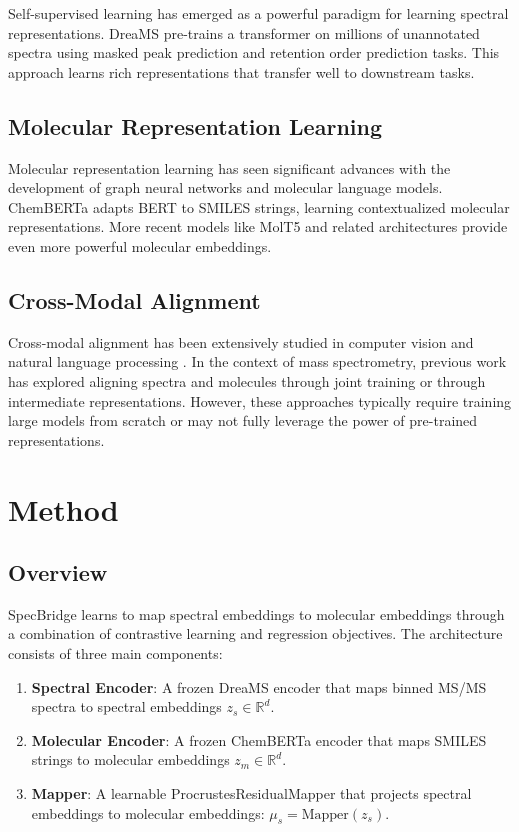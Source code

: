 \documentclass[11pt]{article}
\begin{document}
Self-supervised learning has emerged as a powerful paradigm for learning spectral representations. DreaMS \cite{bushuiev2025selfsupervised} pre-trains a transformer on millions of unannotated spectra using masked peak prediction and retention order prediction tasks. This approach learns rich representations that transfer well to downstream tasks.

\subsection{Molecular Representation Learning}

Molecular representation learning has seen significant advances with the development of graph neural networks \cite{kipf2016semi} and molecular language models. ChemBERTa \cite{chithrananda2020chemberta} adapts BERT to SMILES strings, learning contextualized molecular representations. More recent models like MolT5 \cite{edwards2022translation} and related architectures provide even more powerful molecular embeddings.

\subsection{Cross-Modal Alignment}

Cross-modal alignment has been extensively studied in computer vision and natural language processing \cite{radford2021learning}. In the context of mass spectrometry, previous work has explored aligning spectra and molecules through joint training \cite{wei2019retrieving} or through intermediate representations. However, these approaches typically require training large models from scratch or may not fully leverage the power of pre-trained representations.

\section{Method}

\subsection{Overview}

SpecBridge learns to map spectral embeddings to molecular embeddings through a combination of contrastive learning and regression objectives. The architecture consists of three main components:

\begin{enumerate}
    \item \textbf{Spectral Encoder}: A frozen DreaMS encoder that maps binned MS/MS spectra to spectral embeddings $z_s \in \mathbb{R}^{d}$.
    \item \textbf{Molecular Encoder}: A frozen ChemBERTa encoder that maps SMILES strings to molecular embeddings $z_m \in \mathbb{R}^{d}$.
    \item \textbf{Mapper}: A learnable ProcrustesResidualMapper that projects spectral embeddings to molecular embeddings: $\mu_s = \text{Mapper}(z_s)$.
\end{enumerate}
\end{document}
